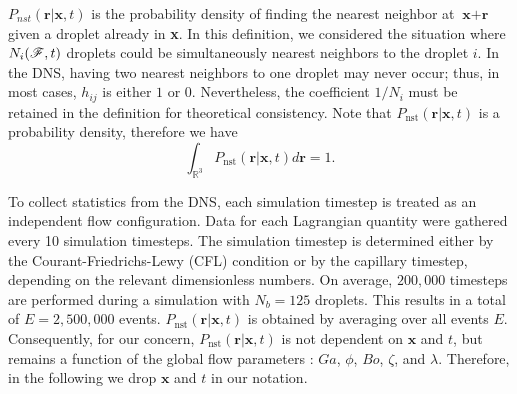 $P_{nst}(\textbf{r}|\textbf{x},t)$ is the probability density of finding the nearest neighbor at $\textbf{x}+\textbf{r}$ given a droplet already in \textbf{x}.
In this definition, we considered the situation where $N_i(\mathscr{F},t)$ droplets could be simultaneously nearest neighbors to the droplet $i$. 
In the DNS, having two nearest neighbors to one droplet may never occur; thus, in most cases, $h_{ij}$ is either $1$ or $0$. 
Nevertheless, the coefficient $1/N_i$ must be retained in the definition for theoretical consistency.
Note that $P_\text{nst}(\textbf{r}|\textbf{x},t)$ is a probability density, therefore we have
\begin{equation*}
    \int_{\mathbb{R}^3}
     P_\text{nst}(\textbf{r}|\textbf{x},t) d\textbf{r}  = 1. 
    \label{eq:Pnst}
\end{equation*}



To collect statistics from the DNS, each simulation timestep is treated as an independent flow configuration. 
Data for each Lagrangian quantity were gathered every 10 simulation timesteps. 
The simulation timestep is determined either by the Courant-Friedrichs-Lewy (CFL) condition or by the capillary timestep, depending on the relevant dimensionless numbers.
On average, $200,000$ timesteps are performed during a simulation with $N_b = 125$ droplets. 
This results in a total of $E = 2,500,000$ events.
$P_\text{nst}(\textbf{r}|\textbf{x},t)$ is obtained by averaging over all events $E$. 
Consequently, for our concern, $P_\text{nst}(\textbf{r}|\textbf{x},t)$ is not dependent on $\mathbf{x}$ and $t$, but remains a function of the global flow parameters :  $Ga$, $\phi$, $Bo$, $\zeta$, and $\lambda$.
Therefore, in the following we drop $\mathbf{x}$ and $t$ in our notation. 

